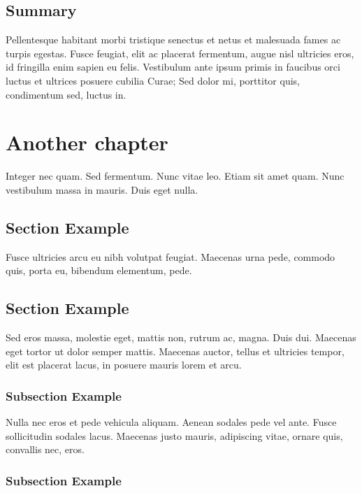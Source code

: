 \section{Summary}

Pellentesque habitant morbi tristique senectus et netus et
malesuada fames ac turpis egestas. Fusce feugiat, elit ac placerat
fermentum, augue nisl ultricies eros, id fringilla enim sapien eu
felis. Vestibulum ante ipsum primis in faucibus orci luctus et
ultrices posuere cubilia Curae; Sed dolor mi, porttitor quis,
condimentum sed, luctus in. 

\chapter{Another chapter}

Integer nec quam. Sed fermentum. Nunc vitae leo. Etiam sit amet
quam. Nunc vestibulum massa in mauris. Duis eget nulla. 

\section{Section Example}

Fusce ultricies arcu eu nibh volutpat feugiat. Maecenas urna pede, 
commodo quis, porta eu, bibendum elementum, pede. 

\section{Section Example}

Sed eros massa, molestie eget, mattis non, rutrum ac, magna. 
Duis dui. Maecenas eget tortor ut dolor semper mattis. 
Maecenas auctor, tellus et ultricies tempor, elit
est placerat lacus, in posuere mauris lorem et arcu. 

\subsection{Subsection Example}

Nulla nec eros et pede vehicula aliquam. Aenean sodales pede vel
ante. Fusce sollicitudin sodales lacus. Maecenas justo mauris,
adipiscing vitae, ornare quis, convallis nec, eros. 

\subsection{Subsection Example}

